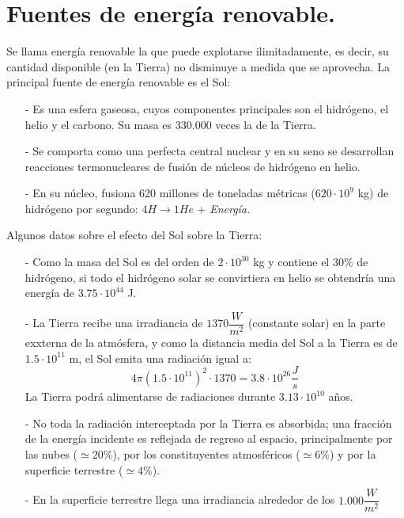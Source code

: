 \section{Fuentes de energía renovable.}
		Se llama energía renovable la que puede explotarse ilimitadamente, es decir, su cantidad disponible (en
		la Tierra) no disminuye a medida que se aprovecha. La principal fuente de energía renovable es el Sol:
		\begin{itemize}
			\item[-]
				Es una esfera gaseosa, cuyos componentes principales son el hidrógeno, el helio y el carbono.
				Su masa es 330.000 veces la de la Tierra.
			\item[-]
				Se comporta como una perfecta central nuclear y en su seno se desarrollan reacciones termonucleares
				de fusión de núcleos de hidrógeno en helio.
			\item[-]
				En su núcleo, fusiona 620 millones de toneladas métricas ($620\cdot10^9$ kg) de hidrógeno por segundo: $4 H\longrightarrow1 He$ + \textit{Energía.}
		\end{itemize}
		
		\indent Algunos datos sobre el efecto del Sol sobre la Tierra:
		\begin{itemize}
			\item[-]
				Como la masa del Sol es del orden de $2\cdot10^{30}$ kg y contiene el 30$\%$ de hidrógeno, si todo el hidrógeno solar se convirtiera en helio se obtendría una energía de $3.75\cdot10^{44}$ J.
			\item[-] 
				La Tierra recibe una irradiancia de $1370 \dfrac{\textit{W}}{\textit{m}^2}$ (constante solar) en la parte exxterna de la atmósfera, y como la distancia media del Sol a la Tierra es de $1.5\cdot10^{11}$ m, el Sol emita una radiación igual a:
				\[4\pi(1.5\cdot10^{11})^{2}\cdot1370 = 3.8\cdot10^{26}\dfrac{\textit{J}}{\textit{s}}\]
				La Tierra podrá alimentarse de radiaciones durante $3.13\cdot10^{10}$ años.
			\item[-] 
				No toda la radiación interceptada por la Tierra es absorbida; una fracción de la energía incidente es reflejada
				de regreso al espacio, principalmente por las nubes ($\simeq20\%$), por los constituyentes atmosféricos ($\simeq6\%$) y por la superficie terrestre ($\simeq4\%$).
			\item[-] 
				En la superficie terrestre llega una irradiancia alrededor de los $1.000 \dfrac{\textit{W}}{\textit{m}^2}$
		\end{itemize}
			
